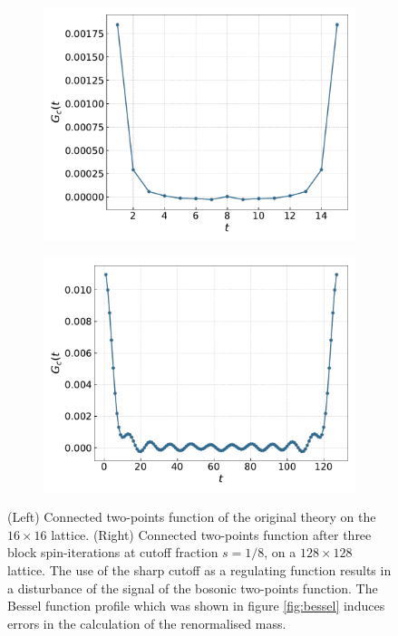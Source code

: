 \begin{figure}
    \centering 
    \begin{subfigure}{0.47\textwidth}
        \includegraphics[width=\textwidth]{figures/conn2ptf16.pdf}
    \end{subfigure}
    \begin{subfigure}{0.47\textwidth}
        \includegraphics[width=\textwidth]{figures/conn2ptf128.pdf}
    \end{subfigure}
    \caption[Effect of the sharp cutoff on the connected two-points function]{(Left) Connected two-points function of the original theory on the $16 \times 16$ lattice. (Right) Connected two-points function after three block spin-iterations at cutoff fraction $s=1/8$, on a $128 \times 128$ lattice. The use of the sharp cutoff as a regulating function results in a disturbance of the signal of the bosonic two-points function. The Bessel function profile which was shown in figure \ref{fig:bessel} induces errors in the calculation of the renormalised mass.}
    \label{fig:connected_2ptf}
\end{figure} \\
